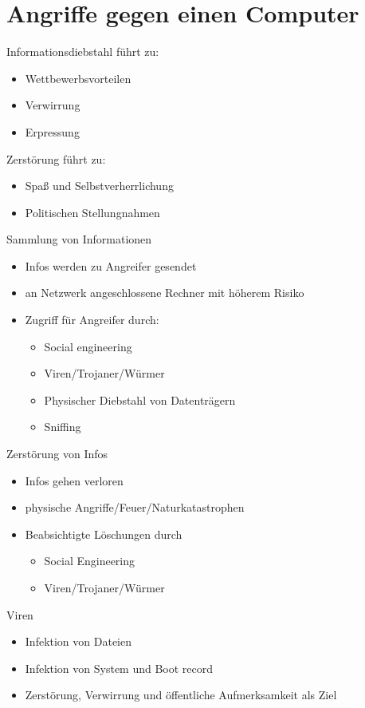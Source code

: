 \documentclass{article} %
\begin{document}
\section{Angriffe gegen einen Computer}
Informationsdiebstahl führt zu:
\begin{itemize}
	\item Wettbewerbsvorteilen
    \item Verwirrung
    \item Erpressung
    
\end{itemize}
Zerstörung führt zu:
\begin{itemize}
	\item Spaß und Selbstverherrlichung
    \item Politischen Stellungnahmen
\end{itemize}
Sammlung von Informationen
\begin{itemize}
	\item Infos werden zu Angreifer gesendet
    \item an Netzwerk angeschlossene Rechner mit höherem Risiko
    \item Zugriff für Angreifer durch:
    
    \begin{itemize}
        \item Social engineering
        \item Viren/Trojaner/Würmer
        \item Physischer Diebstahl von Datenträgern
        \item Sniffing
    \end{itemize}
    
\end{itemize}
Zerstörung von Infos
\begin{itemize}
	\item Infos gehen verloren
    \item physische Angriffe/Feuer/Naturkatastrophen
    \item Beabsichtigte Löschungen durch 
    
    \begin{itemize}
        \item Social Engineering
        \item Viren/Trojaner/Würmer
    \end{itemize}
\end{itemize}
Viren
\begin{itemize}
	\item Infektion von Dateien 
    \item Infektion von System und Boot record
    \item Zerstörung, Verwirrung und öffentliche Aufmerksamkeit als Ziel
\end{itemize}
\end{document}
